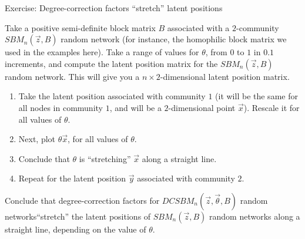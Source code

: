 \begin{floatingbox}[h]\caption{Exercise: Degree-correction factors ``stretch'' latent positions}
\label{box:ch5:psd_block:stretch}
Take a positive semi-definite block matrix $B$ associated with a $2$-community $SBM_n(\vec z, B)$ random network (for instance, the homophilic block matrix we used in the examples here). Take a range of values for $\theta$, from $0$ to $1$ in $0.1$ increments, and compute the latent position matrix for the $SBM_n(\vec z, B)$ random network. This will give you a $n \times 2$-dimensional latent position matrix.
\begin{enumerate}
    \item Take the latent position associated with community $1$ (it will be the same for all nodes in community $1$, and will be a $2$-dimensional point $\vec x$). Rescale it for all values of $\theta$. 
    \item Next, plot $\theta \vec x$, for all values of $\theta$. 
    \item Conclude that $\theta$ is ``stretching'' $\vec x$ along a straight line.
    \item Repeat for the latent position $\vec y$ associated with community $2$.
\end{enumerate}
Conclude that degree-correction factors for $DCSBM_n(\vec z, \vec \theta, B)$ random networks``stretch'' the latent positions of $SBM_n(\vec z, B)$ random networks along a straight line, depending on the value of $\theta$. 
\end{floatingbox}